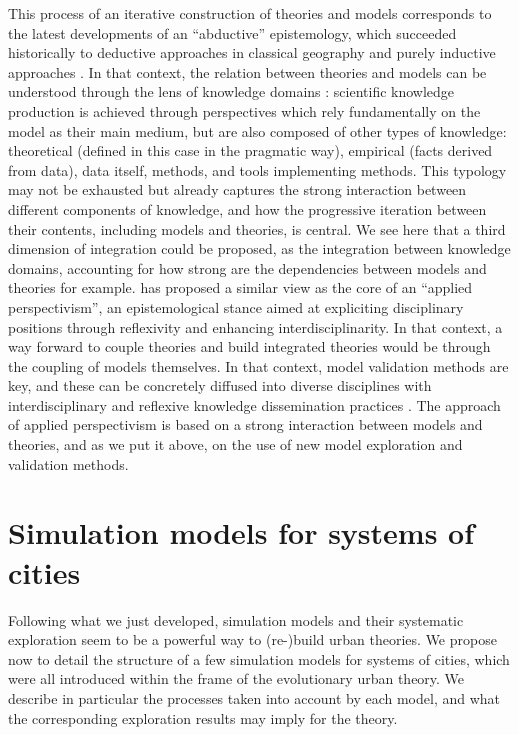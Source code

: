 \documentclass[10pt,letterpaper]{article}
\begin{document}
This process of an iterative construction of theories and models corresponds to the latest developments of an ``abductive'' epistemology, which succeeded historically to deductive approaches in classical geography and purely inductive approaches \citep{varenne2018theories}. In that context, the relation between theories and models can be understood through the lens of knowledge domains \citep{raimbault2017applied}: scientific knowledge production is achieved through perspectives which rely fundamentally on the model as their main medium, but are also composed of other types of knowledge: theoretical (defined in this case in the pragmatic way), empirical (facts derived from data), data itself, methods, and tools implementing methods. This typology may not be exhausted but already captures the strong interaction between different components of knowledge, and how the progressive iteration between their contents, including models and theories, is central. We see here that a third dimension of integration could be proposed, as the integration between knowledge domains, accounting for how strong are the dependencies between models and theories for example. \citep{raimbault2020relating} has proposed a similar view as the core of an ``applied perspectivism'', an epistemological stance aimed at expliciting disciplinary positions through reflexivity and enhancing interdisciplinarity. In that context, a way forward to couple theories and build integrated theories would be through the coupling of models themselves. In that context, model validation methods are key, and these can be concretely diffused into diverse disciplines with interdisciplinary and reflexive knowledge dissemination practices \citep{leclaire2019retour}. The approach of applied perspectivism is based on a strong interaction between models and theories, and as we put it above, on the use of new model exploration and validation methods.


\section{Simulation models for systems of cities}

Following what we just developed, simulation models and their systematic exploration seem to be a powerful way to (re-)build urban theories. We propose now to detail the structure of a few simulation models for systems of cities, which were all introduced within the frame of the evolutionary urban theory. We describe in particular the processes taken into account by each model, and what the corresponding exploration results may imply for the theory.
\end{document}
